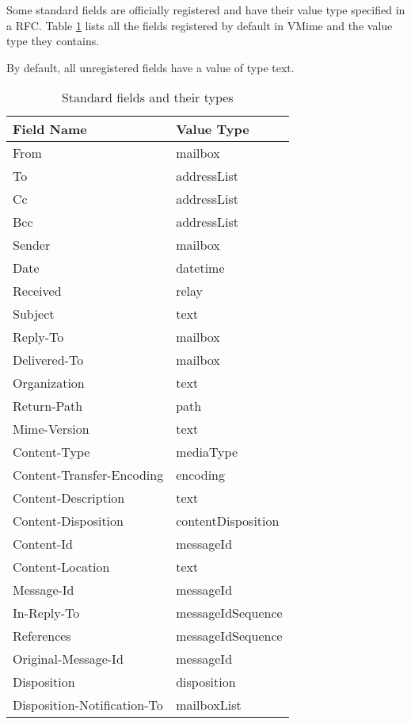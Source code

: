 Some standard fields are officially registered and have their value type
specified in a RFC. Table \ref{standard-fields} lists all the fields
registered by default in VMime and the value type they contains.

By default, all unregistered fields have a value of type {\vcode text}.

\begin{table}[!ht]
\begin{center}
\noindent\begin{tabularx}{0.85\textwidth}{|X|X|}
\hline
	{\bf Field Name} &
	{\bf Value Type} \\
\hline
\hline
From & mailbox \\
To & addressList \\
Cc & addressList \\
Bcc & addressList \\
Sender & mailbox \\
Date & datetime \\
Received & relay \\
Subject & text \\
Reply-To & mailbox \\
Delivered-To & mailbox \\
Organization & text \\
Return-Path & path \\
Mime-Version & text \\
Content-Type & mediaType \\
Content-Transfer-Encoding & encoding \\
Content-Description & text \\
Content-Disposition & contentDisposition \\
Content-Id & messageId \\
Content-Location & text \\
Message-Id & messageId \\
In-Reply-To & messageIdSequence \\
References & messageIdSequence \\
Original-Message-Id & messageId \\
Disposition & disposition \\
Disposition-Notification-To & mailboxList \\
\hline
\end{tabularx}
\end{center}
\label{standard-fields}
\caption{Standard fields and their types}
\end{table}


